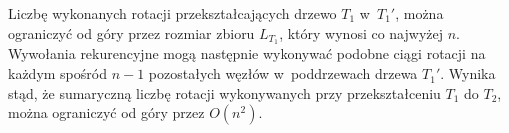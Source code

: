 Liczbę wykonanych rotacji przekształcających drzewo $T_1$ w~$T_1'$, można ograniczyć od góry przez rozmiar zbioru $L_{T_1}$, który wynosi co najwyżej $n$.
Wywołania rekurencyjne mogą następnie wykonywać podobne ciągi rotacji na każdym spośród $n-1$ pozostałych węzłów w~poddrzewach drzewa $T_1'$.
Wynika stąd, że sumaryczną liczbę rotacji wykonywanych przy przekształceniu $T_1$ do $T_2$, można ograniczyć od góry przez $O(n^2)$.
